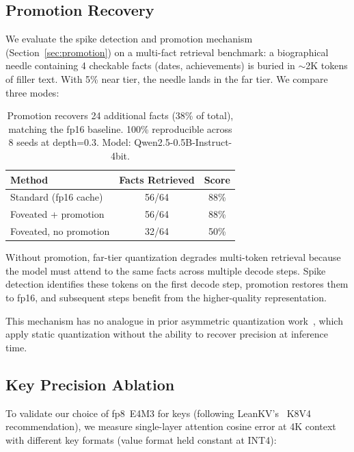 \documentclass{article}
\begin{document}
\subsection{Promotion Recovery}

We evaluate the spike detection and promotion mechanism
(Section~\ref{sec:promotion}) on a multi-fact retrieval benchmark: a
biographical needle containing 4 checkable facts (dates, achievements)
is buried in $\sim$2K tokens of filler text. With 5\% near tier, the
needle lands in the far tier. We compare three modes:

\begin{table}[h]
\centering
\begin{tabular}{lcc}
\toprule
Method & Facts Retrieved & Score \\
\midrule
Standard (fp16 cache) & 56/64 & 88\% \\
Foveated + promotion & 56/64 & 88\% \\
Foveated, no promotion & 32/64 & 50\% \\
\bottomrule
\end{tabular}
\caption{Promotion recovers 24 additional facts (38\% of total),
matching the fp16 baseline. 100\% reproducible across 8 seeds at
depth=0.3. Model: Qwen2.5-0.5B-Instruct-4bit.}
\label{tab:promotion}
\end{table}

Without promotion, far-tier quantization degrades multi-token retrieval
because the model must attend to the same facts across multiple decode
steps. Spike detection identifies these tokens on the first decode step,
promotion restores them to fp16, and subsequent steps benefit from the
higher-quality representation.

This mechanism has no analogue in prior asymmetric quantization
work~\cite{kivi, leankv, kvadaquant, asymkv}, which apply static
quantization without the ability to recover precision at inference time.

\subsection{Key Precision Ablation}

To validate our choice of fp8~E4M3 for keys (following
LeanKV's~\cite{leankv} K8V4 recommendation), we measure single-layer
attention cosine error at 4K context with different key formats (value
format held constant at INT4):
\end{document}
